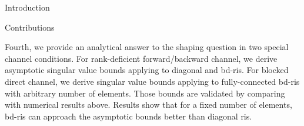 \documentclass[journal]{IEEEtran}
\begin{document}
\begin{section}{Introduction}
\begin{subsection}{Contributions}

		Fourth, we provide an analytical answer to the shaping question in two special channel conditions.
		For rank-deficient forward/backward channel, we derive asymptotic singular value bounds applying to diagonal and \gls{bd}-\gls{ris}.
		For blocked direct channel, we derive singular value bounds applying to fully-connected \gls{bd}-\gls{ris} with arbitrary number of elements.
		Those bounds are validated by comparing with numerical results above.
		Results show that for a fixed number of elements, \gls{bd}-\gls{ris} can approach the asymptotic bounds better than diagonal \gls{ris}.





\end{subsection}
\end{section}
\end{document}
